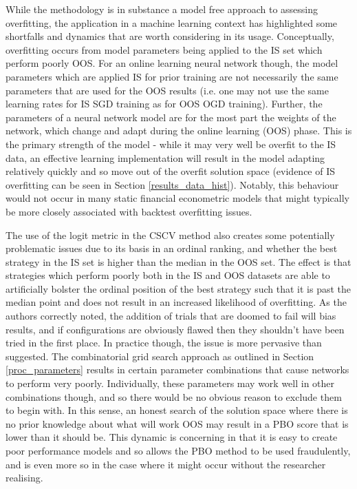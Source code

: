 \documentclass[a4paper,11pt,oneside]{article}
\theoremstyle{plain}
\theoremstyle{definition}
\begin{document}
	\texttt{}\newline
	While the methodology is in substance a model free approach to assessing overfitting, the application in a machine learning context has highlighted some shortfalls and dynamics that are worth considering in its usage. Conceptually, overfitting occurs from model parameters being applied to the IS set which perform poorly OOS. For an online learning neural network though, the model parameters which are applied IS for prior training are not necessarily the same parameters that are used for the OOS results (i.e. one may not use the same learning rates for IS SGD training as for OOS OGD training). Further, the parameters of a neural network model are for the most part the weights of the network, which change and adapt during the online learning (OOS) phase. This is the primary strength of the model - while it may very well be overfit to the IS data, an effective learning implementation will result in the model adapting relatively quickly and so move out of the overfit solution space (evidence of IS overfitting can be seen in Section \ref{results_data_hist}). Notably, this behaviour would not occur in many static financial econometric models that might typically be more closely associated with backtest overfitting issues.\newline 
	
	The use of the logit metric in the CSCV method also creates some potentially problematic issues due to its basis in an ordinal ranking, and whether the best strategy in the IS set is higher than the median in the OOS set. The effect is that strategies which perform poorly both in the IS and OOS datasets are able to artificially bolster the ordinal position of the best strategy such that it is past the median point and does not result in an increased likelihood of overfitting. As the authors correctly noted, the addition of trials that are doomed to fail will bias results, and if configurations are obviously flawed then they shouldn't have been tried in the first place. In practice though, the issue is more pervasive than suggested. The combinatorial grid search approach as outlined in Section \ref{proc_parameters} results in certain parameter combinations that cause networks to perform very poorly. Individually, these parameters may work well in other combinations though, and so there would be no obvious reason to exclude them to begin with. In this sense, an honest search of the solution space where there is no prior knowledge about what will work OOS may result in a PBO score that is lower than it should be. This dynamic is concerning in that it is easy to create poor performance models and so allows the PBO method to be used fraudulently, and is even more so in the case where it might occur without the researcher realising. \newline
	
\end{document}

